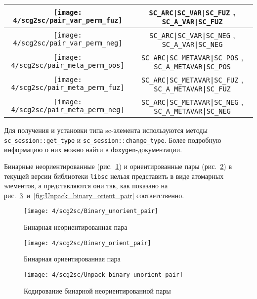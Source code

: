 \begin{table}[ht]
\begin{tabular}{|c|c|}
    \hline
    \texttt{[image: 4/scg2sc/pair\_var\_perm\_fuz]} & \verb+SC_ARC|SC_VAR|SC_FUZ+
    , \verb+SC_A_VAR|SC_FUZ+ \\

    \hline
    \texttt{[image: 4/scg2sc/pair\_var\_perm\_neg]} & \verb+SC_ARC|SC_VAR|SC_NEG+
    , \verb+SC_A_VAR|SC_NEG+ \\

    \hline
    \texttt{[image: 4/scg2sc/pair\_meta\_perm\_pos]} & \verb+SC_ARC|SC_METAVAR|SC_POS+
    , \verb+SC_A_METAVAR|SC_POS+ \\

    \hline
    \texttt{[image: 4/scg2sc/pair\_meta\_perm\_fuz]} & \verb+SC_ARC|SC_METAVAR|SC_FUZ+
    , \verb+SC_A_METAVAR|SC_FUZ+ \\

    \hline
    \texttt{[image: 4/scg2sc/pair\_meta\_perm\_neg]} & \verb+SC_ARC|SC_METAVAR|SC_NEG+
    , \verb+SC_A_METAVAR|SC_NEG+ \\

    \hline
  \end{tabular}
  \label{tab:SCgType2SCType}
\end{table}

Для получения и установки типа sc-элемента используются методы
\lstinline{sc_session::get_type} и
\lstinline{sc_session::change_type}. Более подробную информацию о них
можно найти в \texttt{doxygen}-документации.

Бинарные неориентированные (рис.~\ref{fig:Binary_unorient_pair}) и
ориентированные пары (рис.~\ref{fig:Binary_orient_pair}) в текущей
версии библиотеки \texttt{libsc} нельзя представить в виде атомарных
элементов, а представляются они так, как показано на
рис.~\ref{fig:Unpack_binary_unorient_pair}~и~\ref{fig:Unpack_binary_orient_pair}
соответственно.

\begin{figure}[h!]
  \centering
  \texttt{[image: 4/scg2sc/Binary\_unorient\_pair]}
  \caption{Бинарная неориентированная пара}
  \label{fig:Binary_unorient_pair}
\end{figure}

\begin{figure}[h!]
  \centering
  \texttt{[image: 4/scg2sc/Binary\_orient\_pair]}
  \caption{Бинарная ориентированная пара}
  \label{fig:Binary_orient_pair}
\end{figure}

\begin{figure}[h!]
  \centering
  \texttt{[image: 4/scg2sc/Unpack\_binary\_unorient\_pair]}
  \caption{Кодирование бинарной неориентированной пары}
  \label{fig:Unpack_binary_unorient_pair}
\end{figure}

